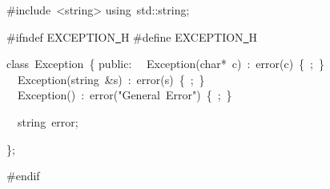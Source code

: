 {\ttfamily \raggedright \footnotesize
\#include\ <{}string>{}
using\ std::string;

\#ifndef EXCEPTION\underline\ H
\#define EXCEPTION\underline\ H

class\ Exception\ \{
public:
\ \ Exception(char*\ c)\ :\ error(c)\ \{\ ;\ \}
\ \ Exception(string\ \&s)\ :\ error(s)\ \{\ ;\ \}
\ \ Exception()\ :\ error("{}General\ Error"{})\ \{\ ;\ \}

\ \ string\ error;

\};

\#endif

 }
\normalfont\normalsize

